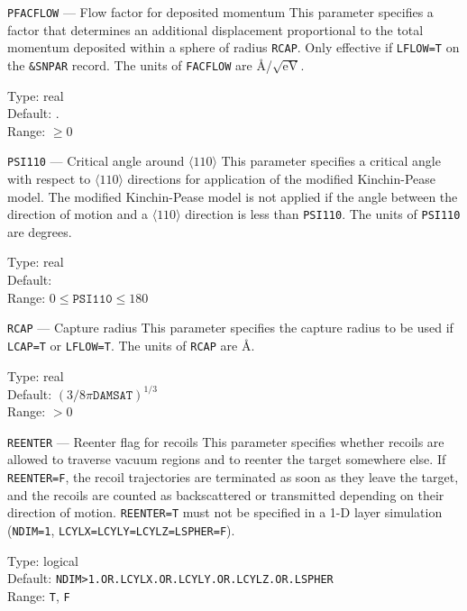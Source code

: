 \ifprivate
\begin{keydescription}{\texttt{PFACFLOW} --- Flow factor for deposited momentum}
%
  This parameter specifies a factor that determines an additional displacement
  proportional to the total momentum deposited within a sphere of radius 
  \texttt{RCAP}. Only effective if \texttt{LFLOW=T} on the \texttt{\&SNPAR}
  record. The units of \texttt{FACFLOW} are \AA/$\sqrt{\mathrm{eV}}$.
  \begin{keytab}
    Type:    \> real \\
    Default: . \\
    Range:   \> $\ge 0$
  \end{keytab}
\end{keydescription}
\fi

\begin{keydescription}{\texttt{PSI110} --- Critical angle around
    $\langle 110 \rangle$}
%
  This parameter specifies a critical angle with respect to 
  $\langle 110 \rangle$ directions for application of the modified Kinchin-Pease
  model.  The modified Kinchin-Pease model is not applied if the angle between 
  the direction of motion and a $\langle 110 \rangle$ direction is less than 
  \texttt{PSI110}.  The units of \texttt{PSI110} are
  degrees.
  \begin{keytab}
    Type:    \> real \\
    Default:  \\
    Range:   \> $0 \le \texttt{PSI110} \le 180$
  \end{keytab}
\end{keydescription}

\begin{keydescription}{\texttt{RCAP} --- Capture radius}
%
  This parameter specifies the capture radius to be used if \texttt{LCAP=T}
  or \texttt{LFLOW=T}.
  The units of \texttt{RCAP} are \AA.
  \begin{keytab}
    Type:    \> real \\
    Default: \> $(3/8 \pi \texttt{DAMSAT})^{1/3}$ \\
    Range:   \> $>0$
  \end{keytab}
\end{keydescription}

\begin{keydescription}{\texttt{REENTER} --- Reenter flag for recoils}
%
  This parameter specifies whether recoils are allowed to traverse 
  vacuum regions and to reenter the target somewhere else. If
  \texttt{REENTER=F}, the recoil trajectories are terminated as soon
  as they leave the target, and the recoils are counted as backscattered or
  transmitted depending on their direction of motion. \texttt{REENTER=T} 
  must not be specified in a 1-D layer simulation (\texttt{NDIM=1},
  \texttt{LCYLX=LCYLY=LCYLZ=LSPHER=F}).
  \begin{keytab}
    Type:    \> logical \\
    Default: \> \texttt{NDIM>1.OR.LCYLX.OR.LCYLY.OR.LCYLZ.OR.LSPHER} \\
    Range:   \> \texttt{T}, \texttt{F}
  \end{keytab}
\end{keydescription}

